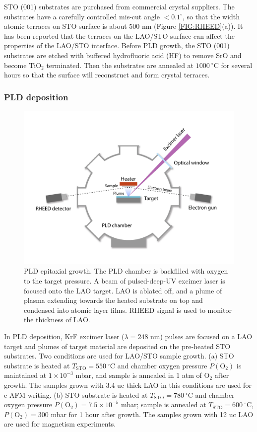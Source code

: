 \documentclass[pdflatex, sectionletters, 12pt, final, phd]{pittetd}    %
\begin{document}
STO (001) substrates are purchased from commercial crystal suppliers. The substrates have a carefully controlled mis-cut angle $< 0.1^{\circ}$, so that the width atomic terraces on STO surface is about 500 nm (Figure \ref{FIG:RHEED}(a)). It has been reported that the terraces on the LAO/STO surface can affect the properties of the LAO/STO interface\cite{fix2011influence}. Before PLD growth, the STO (001) substrates are etched with buffered hydrofluoric acid (HF) to remove SrO and become TiO$_2$ terminated. Then the substrates are annealed at $1000 \ ^{\circ}$C for several hours so that the surface will reconstruct and form crystal terraces\cite{radovic2008low}. 

\subsubsection{PLD deposition}

\begin{figure}[p]
	\centering
	\includegraphics[width=1.0\textwidth]{Drawing/PLD.pdf}
	\caption[PLD epitaxial growth]{PLD epitaxial growth. The PLD chamber is backfilled with oxygen to the target pressure. A beam of pulsed-deep-UV excimer laser is focused onto the LAO target. LAO is ablated off, and a plume of plasma extending towards the heated substrate on top and condensed into atomic layer films. RHEED signal is used to monitor the thickness of LAO.}
	\label{FIG:PLD}
\end{figure}

In PLD deposition, KrF excimer laser ($\lambda = 248$ nm) pulses are focused on a LAO target and plumes of target material are deposited on the pre-heated STO substrates. Two conditions are used for LAO/STO sample growth. (a) STO substrate is heated at $T_\mathrm{STO} = 550 \ ^{\circ}$C and chamber oxygen pressure $P(\mathrm{O}_2)$ is maintained at $1 \times 10^{-3}$ mbar, and sample is annealed in 1 atm of O$_2$ after growth. The samples grown with 3.4 uc thick LAO in this conditions are used for c-AFM writing. (b) STO substrate is heated at $T_\mathrm{STO} = 780 \ ^{\circ}$C and chamber oxygen pressure $P(\mathrm{O}_2) = 7.5 \times 10^{-5}$ mbar; sample is annealed at $T_\mathrm{STO} = 600 \ ^{\circ}$C, $P(\mathrm{O}_2) = 300$ mbar for 1 hour after growth. The samples grown with 12 uc LAO are used for magnetism experiments\cite{bi2014room}.
\end{document}
